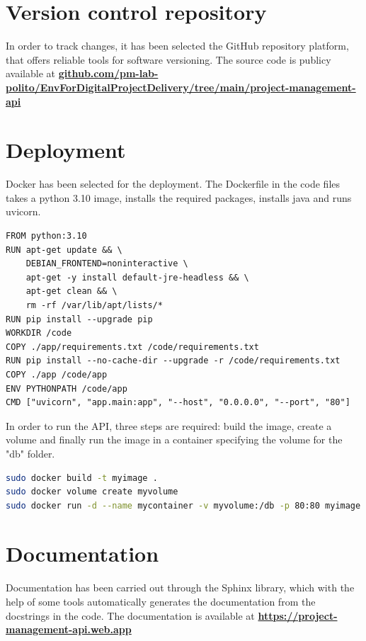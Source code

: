 \documentclass[12pt]{report}
\begin{document}
\section{Version control repository}
In order to track changes, it has been selected the GitHub repository platform, that offers reliable tools for software versioning.\newline
The source code is publicy available at\newline 
\href{https://github.com/pm-lab-polito/EnvForDigitalProjectDelivery/tree/main/project-management-api}{\textbf{github.com/pm-lab-polito/EnvForDigitalProjectDelivery/tree/main/project-management-api}}

\section{Deployment}
Docker has been selected for the deployment. The Dockerfile in the code files takes a python 3.10 image, installs the required packages, installs java and runs uvicorn.

\begin{lstlisting}
FROM python:3.10
RUN apt-get update && \
    DEBIAN_FRONTEND=noninteractive \
    apt-get -y install default-jre-headless && \
    apt-get clean && \
    rm -rf /var/lib/apt/lists/*
RUN pip install --upgrade pip
WORKDIR /code
COPY ./app/requirements.txt /code/requirements.txt
RUN pip install --no-cache-dir --upgrade -r /code/requirements.txt
COPY ./app /code/app
ENV PYTHONPATH /code/app
CMD ["uvicorn", "app.main:app", "--host", "0.0.0.0", "--port", "80"]
\end{lstlisting}

In order to run the API, three steps are required: build the image, create a volume and finally run the image in a container specifying the volume for the "db" folder.
\begin{lstlisting}[language=bash]
sudo docker build -t myimage .
sudo docker volume create myvolume
sudo docker run -d --name mycontainer -v myvolume:/db -p 80:80 myimage
\end{lstlisting}

\section{Documentation}
Documentation has been carried out through the Sphinx library, which with the help of some tools automatically generates the documentation from the docstrings in the code.
The documentation is available at\newline
\href{https://project-management-api.web.app}{\textbf{https://project-management-api.web.app}}
\end{document}
